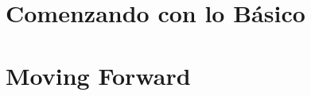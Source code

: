 \documentclass[10pt]{book}
\begin{document}
% 


\mainmatter

\part{Comenzando con lo Básico}


























\part{Moving Forward}











\appendix



\printindex

\end{document}
